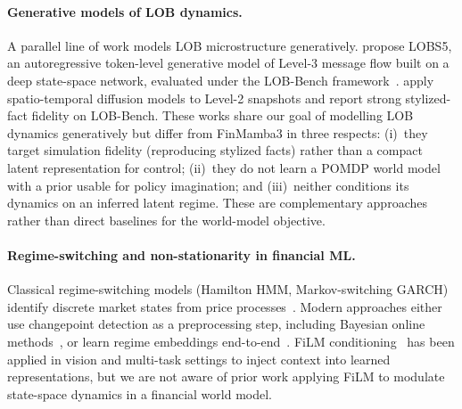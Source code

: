 \documentclass{article}
\begin{document}
\paragraph{Generative models of LOB dynamics.}
A parallel line of work models LOB microstructure generatively.
\citet{nagy2023lobs5} propose LOBS5, an autoregressive token-level
generative model of Level-3 message flow built on a deep state-space
network, evaluated under the LOB-Bench
framework~\citep{nagy2025lobbench}.
\citet{backhouse2025painting} apply spatio-temporal diffusion models to
Level-2 snapshots and report strong stylized-fact fidelity on LOB-Bench.
These works share our goal of modelling LOB dynamics generatively but
differ from FinMamba3 in three respects: (i)~they target simulation
fidelity (reproducing stylized facts) rather than a compact latent
representation for control; (ii)~they do not learn a POMDP world model
with a prior usable for policy imagination; and (iii)~neither conditions
its dynamics on an inferred latent regime.  These are complementary
approaches rather than direct baselines for the world-model objective.

\paragraph{Regime-switching and non-stationarity in financial ML.}
Classical regime-switching models (Hamilton HMM, Markov-switching GARCH)
identify discrete market states from price
processes~\citep{hamilton1989new}.  Modern approaches either use
changepoint detection as a preprocessing step, including Bayesian online
methods~\citep{adams2007bayesian}, or learn regime embeddings
end-to-end~\citep{lim2021time}.  FiLM
conditioning~\citep{perez2018film} has been applied in vision and
multi-task settings to inject context into learned representations, but
we are not aware of prior work applying FiLM to modulate state-space
dynamics in a financial world model.
\end{document}

